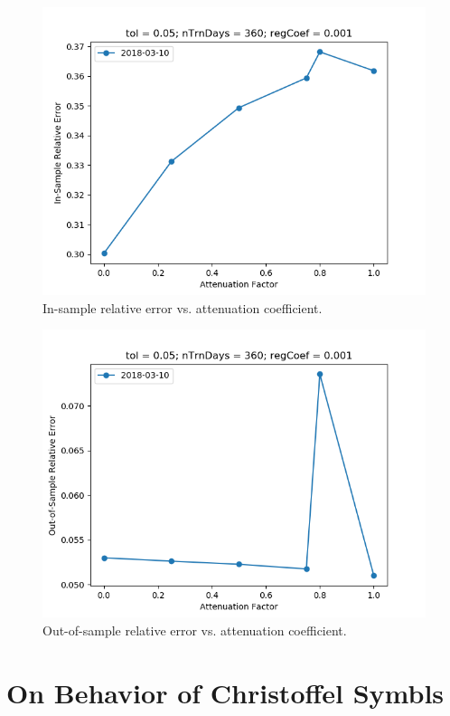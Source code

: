 \documentclass{article}
\begin{document}
\begin{figure}\label{fig:atnFct-sensitivity-error}
\includegraphics[bb=0 0 640 480]{figures/atnFct-sensitivity-error.png}
\caption{In-sample relative error vs. attenuation coefficient.}
\end{figure}

\begin{figure}\label{fig:atnFct-sensitivity-oos-error}
\includegraphics[bb=0 0 640 480]{figures/atnFct-sensitivity-oos-error.png}
\caption{Out-of-sample relative error vs. attenuation coefficient.}
\end{figure}

\section{On Behavior of Christoffel Symbls}\label{section:christoffel-behavior}
\end{document}
